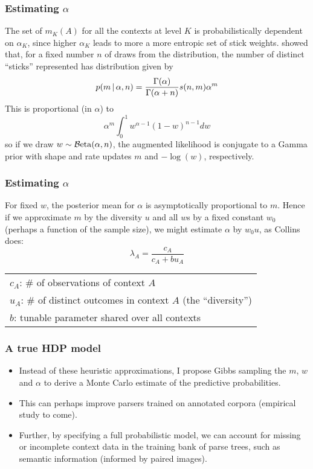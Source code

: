 \documentclass[11pt, serif, mathserif, table,trans]{beamer}
\begin{document}
\begin{frame}
  \frametitle{Estimating $\alpha$}
  The set of $m_K(A)$ for all the contexts at level $K$ is
  probabilistically dependent on $\alpha_{K}$, since higher $\alpha_K$
  leads to more a more entropic set of stick weights.
  \cite{antoniak1974mixtures} showed that, for a fixed number $n$ of draws
  from the distribution, the number of distinct ``sticks'' represented
  has distribution given by
  \begin{equation}
    \label{eq:27}
    p(m \, \vert \, \alpha, n) = \frac{\Gamma(\alpha)}{\Gamma(\alpha +
      n)} s(n,m) \alpha^m
  \end{equation}
  This is proportional (in $\alpha$) to
  \begin{equation}
    \label{eq:28}
    \alpha^m \int_0^1 w^{\alpha-1}(1-w)^{n-1} dw
  \end{equation}
  so if we draw $w \sim \mathcal{B}\mathrm{eta}(\alpha,n)$, the augmented likelihood is
  conjugate to a Gamma prior with shape and rate updates $m$ and
  $-\log(w)$, respectively.
\end{frame}
\begin{frame}
  \frametitle{Estimating $\alpha$}
  For fixed $w$, the posterior mean for $\alpha$ is asymptotically
  proportional to $m$.  Hence if we approximate $m$ by the diversity $u$ and all
  $w$s by a fixed constant $w_0$ (perhaps a function of the sample size), we
  might estimate $\alpha$ by $w_0 u$, as Collins does:
    \begin{equation*}
      \label{eq:2}
      \lambda_{A} = \frac{c_A}{c_A + b u_A}
    \end{equation*}
    \begin{center}
    \begin{tabular}{l}
      $c_A$: \# of observations of context $A$ \\
      $u_A$: \# of distinct outcomes in context $A$ (the
      ``diversity'') \\
      $b$: tunable parameter shared over all contexts
    \end{tabular}
  \end{center}
\end{frame}

\begin{frame}
  \frametitle{A true HDP model}
  \begin{itemize}[<+->]
  \item Instead of these heuristic approximations, I propose Gibbs sampling
    the $m$,
    $w$ and $\alpha$ to derive a Monte Carlo estimate of the predictive
    probabilities.
  \item This can perhaps improve parsers trained on annotated corpora
    (empirical study to come).
  \item Further, by specifying a full probabilistic model, we can account for missing or
    incomplete context data in the training bank of parse trees, such
    as semantic information (informed by paired images).
\end{itemize}
\end{frame}
\end{document}
